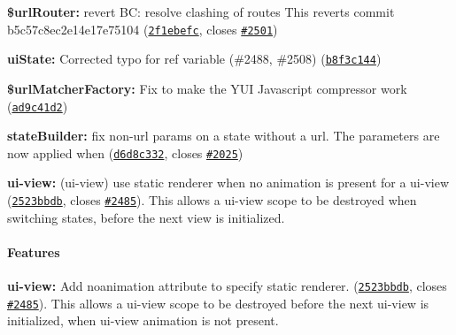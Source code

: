{\bfseries {\bfseries 
\begin{DoxyItemize}
\item {\bfseries \$url\+Router\+:} revert BC\+: resolve clashing of routes This reverts commit b5c57c8ec2e14e17e75104 (\href{https://github.com/angular-ui/ui-router/commit/2f1ebefc242ff48960e0bf63da359296a38f6852}{\tt 2f1ebefc}, closes \href{https://github.com/angular-ui/ui-router/issues/2501}{\tt \#2501})
\item {\bfseries ui\+State\+:} Corrected typo for \textquotesingle{}ref\textquotesingle{} variable (\#2488, \#2508) (\href{https://github.com/angular-ui/ui-router/commit/b8f3c144b913e620f177b78f3b4f52afa61d41a6}{\tt b8f3c144})
\item {\bfseries \$url\+Matcher\+Factory\+:} Fix to make the Y\+UI Javascript compressor work (\href{https://github.com/angular-ui/ui-router/commit/ad9c41d2e723d50e30dd3452fbd274b7057dc3d9}{\tt ad9c41d2})
\item {\bfseries state\+Builder\+:} fix non-\/url params on a state without a url. The parameters are now applied when (\href{https://github.com/angular-ui/ui-router/commit/d6d8c3322c4dde8bb5b8dde25f9fcda49e9c4c81}{\tt d6d8c332}, closes \href{https://github.com/angular-ui/ui-router/issues/2025}{\tt \#2025})
\item {\bfseries ui-\/view\+:} (ui-\/view) use static renderer when no animation is present for a ui-\/view (\href{https://github.com/angular-ui/ui-router/commit/2523bbdb5542483a489c22804f1751b8b9f71703}{\tt 2523bbdb}, closes \href{https://github.com/angular-ui/ui-router/issues/2485}{\tt \#2485}). This allows a ui-\/view scope to be destroyed when switching states, before the next view is initialized.
\end{DoxyItemize}}}

{\bfseries {\bfseries \paragraph*{Features}}}

{\bfseries {\bfseries }}

{\bfseries {\bfseries 
\begin{DoxyItemize}
\item {\bfseries ui-\/view\+:} Add noanimation attribute to specify static renderer. (\href{https://github.com/angular-ui/ui-router/commit/2523bbdb5542483a489c22804f1751b8b9f71703}{\tt 2523bbdb}, closes \href{https://github.com/angular-ui/ui-router/issues/2485}{\tt \#2485}). This allows a ui-\/view scope to be destroyed before the next ui-\/view is initialized, when ui-\/view animation is not present.
\end{DoxyItemize}}}

